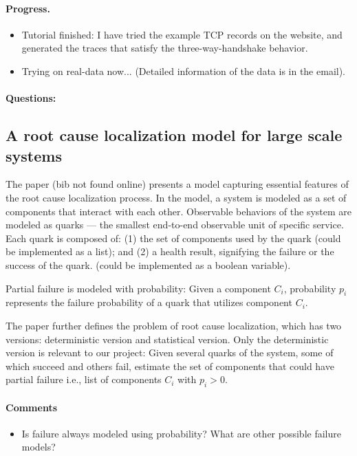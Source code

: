 \documentclass{article}
\begin{document}
\paragraph{Progress.}

\begin{itemize}
\item Tutorial finished: I have tried the example TCP records on the \saf
  website, and generated the traces that satisfy the three-way-handshake
  behavior.
\item Trying \saf{} on real-data now... (Detailed information of the data is in
  the email).
\end{itemize}

\paragraph{Questions:}


\subsection{A root cause localization model for large scale systems}
\label{sec:rootcause}

The paper (bib not found online) presents a model capturing essential features of the root cause
localization process. In the model, a system is modeled as a set of components
that interact with each other. Observable behaviors of the system are modeled as
quarks --- the smallest end-to-end observable unit of specific service. Each
quark is composed of:
(1) the set of components used by the quark (could be implemented as a list); and
(2) a health result, signifying the failure or the success of the quark. (could
be implemented as a boolean variable).

Partial failure is modeled with probability: Given a component $C_i$,
probability $p_i$ represents the failure probability of a quark that utilizes
component $C_i$.

The paper further defines the problem of root cause localization, which has two
versions: deterministic version and statistical version. Only the deterministic
version is relevant to our project: Given several quarks of the system, some of
which succeed and others fail, estimate the set of components that could have partial
failure i.e., list of components $C_i$ with $p_i > 0$.

\paragraph{Comments}

\begin{itemize}
\item Is failure always modeled using probability? What are other possible
  failure models?
\end{itemize}



{}

\end{document}
